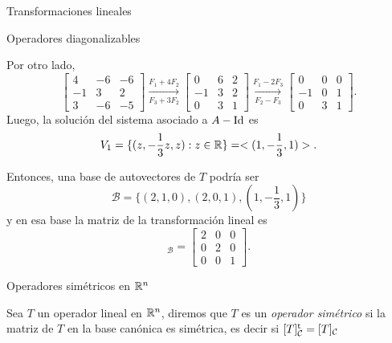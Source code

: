 \begin{chapter}{Transformaciones lineales}
\begin{section}{Operadores diagonalizables}
\begin{ejemplo*}
            Por otro lado, 
            \begin{equation*}
            \begin{bmatrix}4 &-6 &-6\\ -1& 3& 2\\3 &-6& -5 	\end{bmatrix}
            \underset{F_3+3F_2}{\stackrel{F_1+4 F_2}{\longrightarrow}} 
            \begin{bmatrix}0 &6 &2\\ -1& 3& 2\\0 &3& 1 	\end{bmatrix}
            \underset{F_2-F_3}{\stackrel{F_1-2 F_3}{\longrightarrow}}
            \begin{bmatrix}0 &0 &0\\ -1& 0& 1\\0 &3& 1 	\end{bmatrix}.
            \end{equation*}
            Luego,  la solución del sistema asociado a  $A-\operatorname{Id}$ es 
            $$
            V_1 = \{(z,-\frac13z,z): z \in \mathbb R\} = <(1,-\frac13,1)>.
            $$
            
            Entonces, una base de autovectores de $T$ podría ser
            $$
            \mathcal{B} = \{(2,1,0),(2,0,1),(1,-\frac13,1) \}
            $$
            y en esa base la matriz de la transformación lineal es
            \begin{equation*}
            [T]_{\mathcal{B}} = \begin{bmatrix}2 &0 &0\\ 0& 2& 0\\0 &0& 1 	\end{bmatrix}.
            \end{equation*}
        \end{ejemplo*}
    
        
        \end{section}
    
    
        
    

\begin{section}{Operadores simétricos en $\mathbb R^n$}\label{seccion-operadores-simetricos-rn}
    
    \begin{definicion}
        Sea $T$ un operador lineal  en $\mathbb R^n$,  diremos que $T$ es un \textit{operador simétrico} si la matriz de $T$  en la base canónica es simétrica, es decir si 
        $[T]_{\mathcal{C}}^{{\operatorname{t}}} = [T]_{\mathcal{C}}$
    \end{definicion}
    

\end{section}
\end{chapter}
